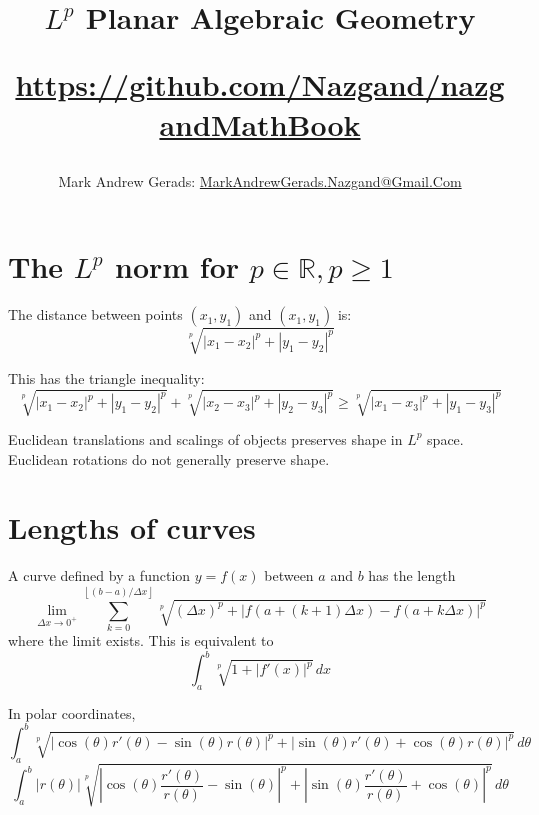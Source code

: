 \documentclass[]{article}
\author{Mark Andrew Gerads: \href{MailTo:MarkAndrewGerads.Nazgand@Gmail.Com}{MarkAndrewGerads.Nazgand@Gmail.Com}}
\title{
	$L^p$ Planar Algebraic Geometry
	
	\href{https://github.com/Nazgand/nazgandMathBook}{https://github.com/Nazgand/nazgandMathBook}
}
\newcommand{\paren}[1]{{\left(#1\right)}}
\newcommand{\abs}[1]{{\left\lvert#1\right\rvert}}
\newcommand{\floor}[1]{{\left\lfloor#1\right\rfloor}}
\begin{document}
\maketitle

\begin{abstract}

\end{abstract}

\section{The $L^p$ norm for $p\in\mathbb{R},p\geq 1$}
The distance between points $\paren{x_1,y_1}$ and $\paren{x_1,y_1}$ is:
\begin{equation}
\sqrt[p]{\abs{x_1-x_2}^p+\abs{y_1-y_2}^p}
\end{equation}

This has the triangle inequality:
\begin{equation}
\sqrt[p]{\abs{x_1-x_2}^p+\abs{y_1-y_2}^p}+
\sqrt[p]{\abs{x_2-x_3}^p+\abs{y_2-y_3}^p}\geq
\sqrt[p]{\abs{x_1-x_3}^p+\abs{y_1-y_3}^p}
\end{equation}

Euclidean translations and scalings of objects preserves shape in $L^p$ space. Euclidean rotations do not generally preserve shape.

\section{Lengths of curves}
A curve defined by a function $y=f\paren{x}$ between $a$ and $b$ has the length
\begin{equation}
\lim\limits_{\Delta x\rightarrow 0^+}\sum_{k=0}^{\floor{\paren{b-a}/\Delta x}}
\sqrt[p]{\paren{\Delta x}^p+\abs{f\paren{a+\paren{k+1}\Delta x}-f\paren{a+k\Delta x}}^p}
\end{equation}
where the limit exists. This is equivalent to
\begin{equation}
\int_{a}^{b}
\sqrt[p]{1+\abs{f'\paren{x}}^p} \,dx
\end{equation}

In polar coordinates,
\begin{equation}
\int_{a}^{b}
\sqrt[p]{\abs{\cos\paren{\theta}r'\paren{\theta}-\sin\paren{\theta}r\paren{\theta}}^p
	+\abs{\sin\paren{\theta}r'\paren{\theta}+\cos\paren{\theta}r\paren{\theta}}^p
} \,d\theta
\end{equation}
\begin{equation}
\label{CurveLengthPolar2}
\int_{a}^{b}
\abs{r\paren{\theta}}
\sqrt[p]{\abs{\cos\paren{\theta}\frac{r'\paren{\theta}}{r\paren{\theta}}-\sin\paren{\theta}}^p
	+\abs{\sin\paren{\theta}\frac{r'\paren{\theta}}{r\paren{\theta}}+\cos\paren{\theta}}^p
} \,d\theta
\end{equation}
\end{document}
